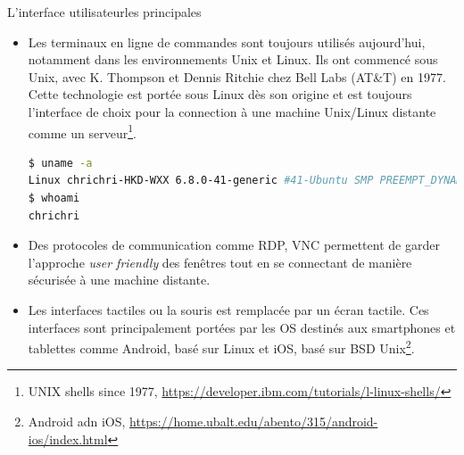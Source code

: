 \documentclass{beamer}
\begin{document}
    \begin{frame}[fragile]{L'interface utilisateur}{les principales}
        \begin{scriptsize}
            \begin{itemize}
                \item Les terminaux en ligne de commandes sont toujours utilisés aujourd'hui, notamment dans les environnements Unix et Linux.
                Ils ont commencé sous Unix, avec K. Thompson et Dennis Ritchie chez Bell Labs (AT\&T) en 1977.
                Cette technologie est portée sous Linux dès son origine et est toujours l'interface de choix pour la connection à une machine Unix/Linux distante comme un serveur\footnote{\label{ibmunix}UNIX shells since 1977, \url{https://developer.ibm.com/tutorials/l-linux-shells/}}.
                \begin{lstlisting}[language=bash]
$ uname -a
Linux chrichri-HKD-WXX 6.8.0-41-generic #41-Ubuntu SMP PREEMPT_DYNAMIC Fri Aug  2 20:41:06 UTC 2024 x86_64 x86_64 x86_64 GNU/Linux
$ whoami
chrichri
                \end{lstlisting}
                \item Des protocoles de communication comme RDP, VNC permettent de garder l'approche \textit{user friendly} des fenêtres tout en se connectant de manière sécurisée à une machine distante.
                \item Les interfaces tactiles ou la souris est remplacée par un écran tactile.
                Ces interfaces sont principalement portées par les OS destinés aux smartphones et tablettes comme Android, basé sur Linux et iOS, basé sur BSD Unix\footnote{Android adn iOS, \url{https://home.ubalt.edu/abento/315/android-ios/index.html}}.
            \end{itemize}
        \end{scriptsize}
    \end{frame}
\end{document}
